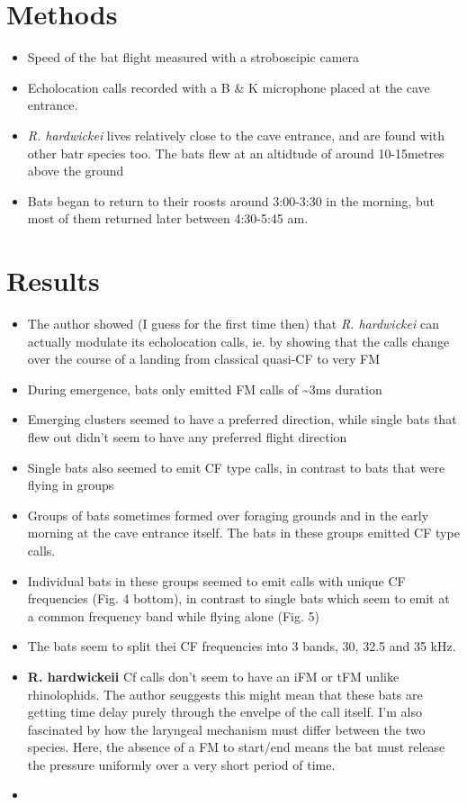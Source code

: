 \documentclass[
]{book}
\providecommand{\tightlist}{%
  \setlength{\itemsep}{0pt}\setlength{\parskip}{0pt}}
\begin{document}
\hypertarget{methods-4}{%
\section{Methods}\label{methods-4}}

\begin{itemize}
\tightlist
\item
  Speed of the bat flight measured with a stroboscipic camera
\item
  Echolocation calls recorded with a B \& K microphone placed at the cave entrance.
\item
  \emph{R. hardwickei} lives relatively close to the cave entrance, and are found with other batr species too. The bats flew at an altidtude of around 10-15metres above the ground
\item
  Bats began to return to their roosts around 3:00-3:30 in the morning, but most of them returned later between 4:30-5:45 am.
\end{itemize}

\hypertarget{results-4}{%
\section{Results}\label{results-4}}

\begin{itemize}
\tightlist
\item
  The author showed (I guess for the first time then) that \emph{R. hardwickei} can actually modulate its echolocation calls, ie. by showing that the calls change over the course of a landing from classical quasi-CF to very FM
\item
  During emergence, bats only emitted FM calls of \textasciitilde3ms duration
\item
  Emerging clusters seemed to have a preferred direction, while single bats that flew out didn't seem to have any preferred flight direction
\item
  Single bats also seemed to emit CF type calls, in contrast to bats that were flying in groups
\item
  Groups of bats sometimes formed over foraging grounds and in the early morning at the cave entrance itself. The bats in these groups emitted CF type calls.
\item
  Individual bats in these groups seemed to emit calls with unique CF frequencies (Fig. 4 bottom), in contrast to single bats which seem to emit at a common frequency band while flying alone (Fig. 5)
\item
  The bats seem to split thei CF frequencies into 3 bands, 30, 32.5 and 35 kHz.
\item
  \textbf{R. hardwickeii} Cf calls don't seem to have an iFM or tFM unlike rhinolophids. The author seuggests this might mean that these bats are getting time delay purely through the envelpe of the call itself. I'm also fascinated by how the laryngeal mechanism must differ between the two species. Here, the absence of a FM to start/end means the bat must release the pressure uniformly over a very short period of time.
\item
\end{itemize}
\end{document}
